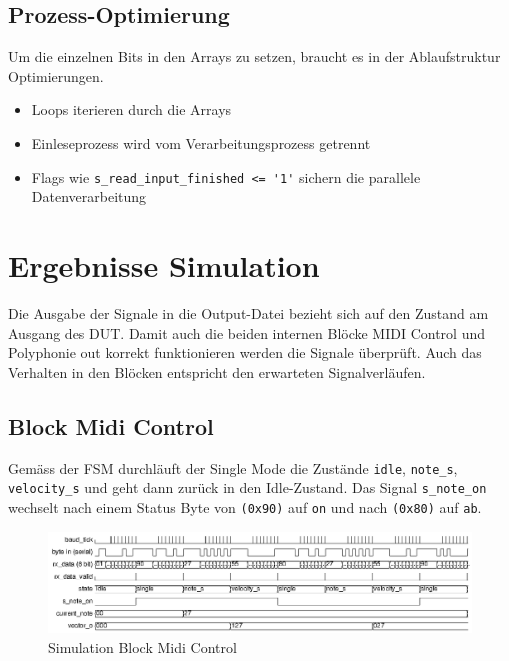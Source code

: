 \subsection{Prozess-Optimierung}

Um die einzelnen Bits in den Arrays zu setzen, braucht es in der Ablaufstruktur Optimierungen.

\begin{itemize}
	\item Loops iterieren durch die Arrays
	\item Einleseprozess wird vom Verarbeitungsprozess getrennt
	\item Flags wie \lstinline|s_read_input_finished <= '1'| sichern die parallele Datenverarbeitung
\end{itemize}

\section{Ergebnisse Simulation}\label{sec.ergebnisse_tests}

Die Ausgabe der Signale in die Output-Datei bezieht sich auf den Zustand am Ausgang des DUT. Damit auch die beiden internen Blöcke MIDI Control und Polyphonie out korrekt funktionieren werden die Signale überprüft. Auch das Verhalten in den Blöcken entspricht den erwarteten Signalverläufen.

\subsection{Block Midi Control}

Gemäss der FSM durchläuft der Single Mode  die Zustände \lstinline|idle|, \lstinline|note_s|, \lstinline|velocity_s| und geht dann zurück  in den Idle-Zustand. Das Signal \lstinline|s_note_on| wechselt nach einem Status Byte von \lstinline|(0x90)| auf \lstinline|on| und nach \lstinline|(0x80)| auf \lstinline|ab|.

\begin{figure}[H]
	\includegraphics[width=1\textwidth]{images/midi_control/wave_single.png}
	\caption{Simulation Block Midi Control}
	\label{fig.test_midi:control_single}
\end{figure} 

